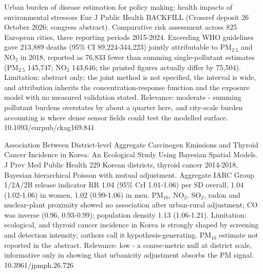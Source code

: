 \documentclass[10pt]{article}
\begin{document}
\par{}\baselineskip{}\baselineskip
{}

{Urban burden of disease estimation for policy making: health impacts of environmental stressors}
{Eur J Public Health}
{BACKFILL (Crossref deposit 26 October 2026; congress abstract). Comparative risk assessment across 825 European cities, three reporting periods 2015-2024. Exceeding WHO guidelines gave 213,889 deaths (95\% CI 89,224-344,223) jointly attributable to PM$_{2.5}$ and NO$_2$ in 2018, reported as 76,833 fewer than summing single-pollutant estimates (PM$_{2.5}$ 145,747; NO$_2$ 143,646; the printed figures actually differ by 75,504). Limitation: abstract only; the joint method is not specified, the interval is wide, and attribution inherits the concentration-response function and the exposure model with no measured validation stated. Relevance: moderate - summing pollutant burdens overstates by about a quarter here, and city-scale burden accounting is where dense sensor fields could test the modelled surface.}
{10.1093/eurpub/ckag169.841}

\par{}\baselineskip{}\baselineskip
{}

{Association Between District-level Aggregate Carcinogen Emissions and Thyroid Cancer Incidence in Korea: An Ecological Study Using Bayesian Spatial Models.}
{J Prev Med Public Health}
{229 Korean districts, thyroid cancer 2014-2018, Bayesian hierarchical Poisson with mutual adjustment. Aggregate IARC Group 1/2A/2B release indicator RR 1.04 (95\% CrI 1.01-1.06) per SD overall, 1.04 (1.02-1.06) in women, 1.02 (0.99-1.06) in men. PM$_{10}$, NO$_2$, SO$_2$, radon and nuclear-plant proximity showed no association after urban-rural adjustment; CO was inverse (0.96, 0.93-0.99); population density 1.13 (1.06-1.21). Limitation: ecological, and thyroid cancer incidence in Korea is strongly shaped by screening and detection intensity; authors call it hypothesis-generating. PM$_{10}$ estimate not reported in the abstract. Relevance: low - a coarse-metric null at district scale, informative only in showing that urbanicity adjustment absorbs the PM signal.}
{10.3961/jpmph.26.726}
\end{document}
